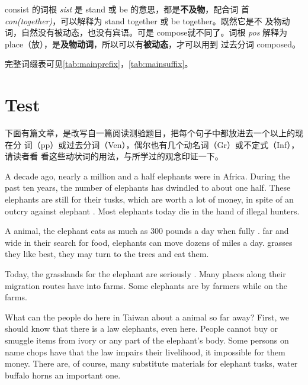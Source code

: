 consist 的词根 \emph{sist} 是 stand 或 be 的意思，都是\textbf{不及物}，配合词
首\emph{con(together)}，可以解释为 stand together 或 be together。既然它是不
及物动词，自然没有被动态，也没有宾语。可是 compose就不同了。词根 \emph{pos}
解释为place（放），是\textbf{及物动词}，所以可以有\textbf{被动态}，才可以用到
过去分词 composed。

完整词缀表可见\cref{tab:mainprefix}，\cref{tab:mainsuffix}。


\section{Test}

下面有篇文章，是改写自一篇阅读测验题目，把每个句子中都放进去一个以上的现在分
词（pp）或过去分词（Ven），偶尔也有几个动名词（Gr）或不定式（Inf），请读者看
看这些动状词的用法，与所学过的观念印证一下。

A decade ago, nearly a million and a half elephants were  in
Africa. During the past ten years, the number of elephants has dwindled to
about one half. These elephants are still   for
their tusks, which are worth a lot of money, in spite of an
 outcry against elephant . Most elephants
 today die in the hand of illegal hunters.

A  animal, the elephant eats as much as 300 pounds a
day when fully .  far and wide in their search
for food, elephants can move dozens of miles a day.   grasses they like best, they may turn to the trees and eat them.

Today, the  grasslands for the elephant are seriously
. Many places along their migration routes have 
 into farms. Some elephants are  by farmers while
 on the farms.

What can the people do here in Taiwan about a  animal
 so far away? First, we should know that there is a law
 elephants, even here. People cannot buy or smuggle items
 from ivory or any part of the elephant's body. Some
 persons  on  name chops have
  that the law impairs their livelihood, 
it impossible for them  money. There are, of course, many
substitute materials for elephant tusks, water buffalo horns  an
important one.

